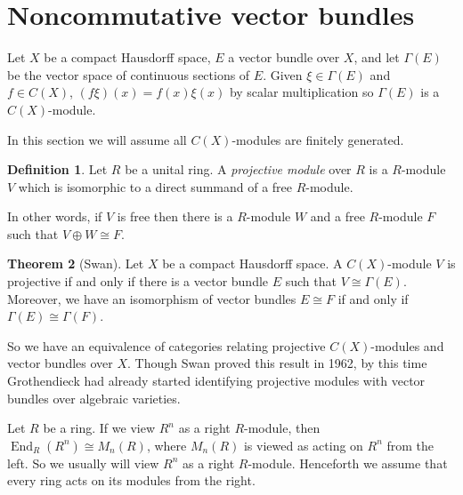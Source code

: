 \documentclass[12pt]{report}
\newcommand{\End}{\operatorname{End}}
\newcommand{\dfn}[1]{\emph{#1}\index{#1}}
\theoremstyle{definition}
\newtheorem{theorem}{Theorem}[chapter]
\newtheorem{definition}[theorem]{Definition}
\begin{document}
\section{Noncommutative vector bundles}
    Let $X$ be a compact Hausdorff space, $E$ a vector bundle over $X$, and let $\Gamma(E)$ be the vector space of continuous sections of $E$. Given $\xi \in \Gamma(E)$ and $f \in C(X)$, $(f\xi)(x) = f(x)\xi(x)$ by scalar multiplication so $\Gamma(E)$ is a $C(X)$-module.

    In this section we will assume all $C(X)$-modules are finitely generated.
\begin{definition}
    Let $R$ be a unital ring. A \dfn{projective module} over $R$ is a $R$-module $V$ which is isomorphic to a direct summand of a free $R$-module.
\end{definition}
    In other words, if $V$ is free then there is a $R$-module $W$ and a free $R$-module $F$ such that $V \oplus W \cong F$.
\begin{theorem}[Swan]
    Let $X$ be a compact Hausdorff space. A $C(X)$-module $V$ is projective if and only if there is a vector bundle $E$ such that $V \cong \Gamma(E)$. Moreover, we have an isomorphism of vector bundles $E \cong F$ if and only if $\Gamma(E) \cong \Gamma(F)$.
\end{theorem}
    So we have an equivalence of categories relating projective $C(X)$-modules and vector bundles over $X$. Though Swan proved this result in 1962, by this time Grothendieck had already started identifying projective modules with vector bundles over algebraic varieties.

    Let $R$ be a ring. If we view $R^n$ as a right $R$-module, then $\End_R(R^n) \cong M_n(R)$, where $M_n(R)$ is viewed as acting on $R^n$ from the left. So we usually will view $R^n$ as a right $R$-module. Henceforth we assume that every ring acts on its modules from the right.
\end{document}

